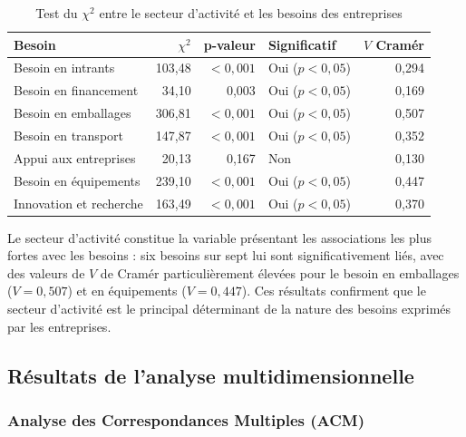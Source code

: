 \documentclass[12pt, a4paper, oneside]{report}
\begin{document}
\begin{table}[H]
  \centering
  \caption{Test du $\chi^2$ entre le secteur d'activité et les besoins des entreprises}
  \label{tab:khi2_secteur}
  \renewcommand{\arraystretch}{1.4}
  \begin{tabularx}{\textwidth}{>{\raggedright\arraybackslash}X r r >{\centering\arraybackslash}p{2.8cm} r}
    \toprule
    \rowcolor{primary!15}
    \textbf{Besoin} & \textbf{$\chi^2$} & \textbf{p-valeur} & \textbf{Significatif} & \textbf{$V$ Cramér} \\
    \midrule
    Besoin en intrants        & 103,48 & $<0{,}001$ & Oui ($p < 0{,}05$) & 0,294 \\
    \rowcolor{lightgray}
    Besoin en financement     &  34,10 & 0,003  & Oui ($p < 0{,}05$) & 0,169 \\
    Besoin en emballages      & 306,81 & $<0{,}001$ & Oui ($p < 0{,}05$) & 0,507 \\
    \rowcolor{lightgray}
    Besoin en transport       & 147,87 & $<0{,}001$ & Oui ($p < 0{,}05$) & 0,352 \\
    Appui aux entreprises     &  20,13 & 0,167  & Non                & 0,130 \\
    \rowcolor{lightgray}
    Besoin en équipements     & 239,10 & $<0{,}001$ & Oui ($p < 0{,}05$) & 0,447 \\
    Innovation et recherche   & 163,49 & $<0{,}001$ & Oui ($p < 0{,}05$) & 0,370 \\
    \bottomrule
  \end{tabularx}
\end{table}

Le secteur d'activité constitue la variable présentant les associations les plus fortes avec les besoins : six besoins sur sept lui sont significativement liés, avec des valeurs de $V$ de Cramér particulièrement élevées pour le besoin en emballages ($V = 0{,}507$) et en équipements ($V = 0{,}447$). Ces résultats confirment que le secteur d'activité est le principal déterminant de la nature des besoins exprimés par les entreprises.

\subsection{Résultats de l'analyse multidimensionnelle}
\label{subsec:multi}

\subsubsection{Analyse des Correspondances Multiples (ACM)}
\end{document}
